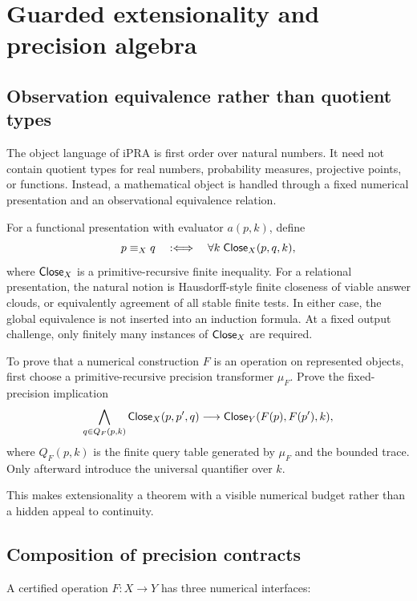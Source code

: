 \section{Guarded extensionality and precision algebra}
\label{sec:extensionality}

\subsection{Observation equivalence rather than quotient types}

The object language of iPRA is first order over natural numbers.  It need not
contain quotient types for real numbers, probability measures, projective
points, or functions.  Instead, a mathematical object is handled through a
fixed numerical presentation and an observational equivalence relation.

For a functional presentation with evaluator \(a(p,k)\), define
\[
 p\equiv_X q
 \quad:\Longleftrightarrow\quad
 \forall k\;\mathsf{Close}_X(p,q,k),
\]
where \(\mathsf{Close}_X\) is a primitive-recursive finite inequality.  For a
relational presentation, the natural notion is Hausdorff-style finite
closeness of viable answer clouds, or equivalently agreement of all stable
finite tests.  In either case, the global equivalence is not inserted into an
induction formula.  At a fixed output challenge, only finitely many instances
of \(\mathsf{Close}_X\) are required.

\begin{principle}
To prove that a numerical construction \(F\) is an operation on represented
objects, first choose a primitive-recursive precision transformer
\(\mu_F\).  Prove the fixed-precision implication
\[
 \bigwedge_{q\in Q_F(p,k)}\mathsf{Close}_X(p,p',q)
 \longrightarrow
 \mathsf{Close}_Y(F(p),F(p'),k),
\]
where \(Q_F(p,k)\) is the finite query table generated by \(\mu_F\) and the
bounded trace.  Only afterward introduce the universal quantifier over
\(k\).
\end{principle}

This makes extensionality a theorem with a visible numerical budget rather
than a hidden appeal to continuity.

\subsection{Composition of precision contracts}

A certified operation \(F:X\to Y\) has three numerical interfaces:

